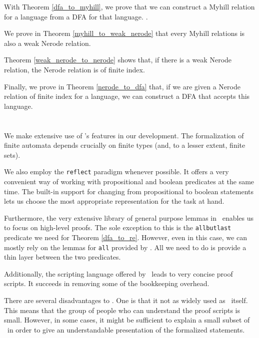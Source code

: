 With Theorem \ref{dfa_to_myhill}, we prove that we can construct a Myhill relation for a language from a DFA for that language.
.

We prove in Theorem \ref{myhill_to_weak_nerode} that every Myhill relations is also a weak Nerode relation.

Theorem \ref{weak_nerode_to_nerode} shows that, if there is a weak Nerode relation, the Nerode relation is of finite index.

Finally, we prove in Theorem \ref{nerode_to_dfa} that, if we are given a Nerode relation of finite index for a language, we can construct a DFA that accepts this language.

\section{\ssreflect}
We make extensive use of \ssreflect's features in our development.
The formalization of finite automata depends crucially on finite types (and, to a lesser extent, finite sets).

We also employ the \lstinline{reflect} paradigm whenever possible.
It offers a very convenient way of working with propositional and boolean predicates at the same time.
The built-in support for changing from propositional to boolean statements lets us choose the most appropriate representation for the task at hand.


Furthermore, the very extensive library of general purpose lemmas in \ssreflect\ enables us to focus on high-level proofs. 
The sole exception to this is the \lstinline{allbutlast} predicate we need for Theorem \ref{dfa_to_re}.
However, even in this case, we can mostly rely on the lemmas for \lstinline{all} provided by \ssreflect.
All we need to do is provide a thin layer between the two predicates.

Additionally, the scripting language offered by \ssreflect\ leads to very concise proof scripts. 
It succeeds in removing some of the bookkeeping overhead. %

There are several disadvantages to \ssreflect. 
One is that it not as widely used as \coq\ itself. 
This means that the group of people who can understand the 
proof scripts is small.
However, in some cases, it might be sufficient to explain a small subset of
\ssreflect\ in order to give an understandable presentation of the formalized statements. 

